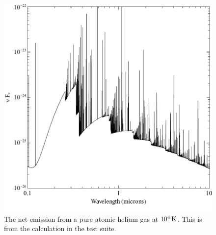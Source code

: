 \begin{figure}
\label{fig:HeI_emission}
\centering
\includegraphics{HeI_emission}
\caption[He I emission]
{The net emission from a pure atomic helium gas at $10^4 {\rm\thinspace K}$.  This
is from the calculation 
in the test suite.}
\end{figure}
